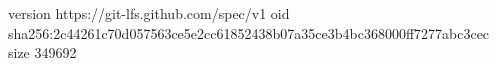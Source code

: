version https://git-lfs.github.com/spec/v1
oid sha256:2c44261c70d057563ce5e2cc61852438b07a35ce3b4bc368000ff7277abc3cec
size 349692
